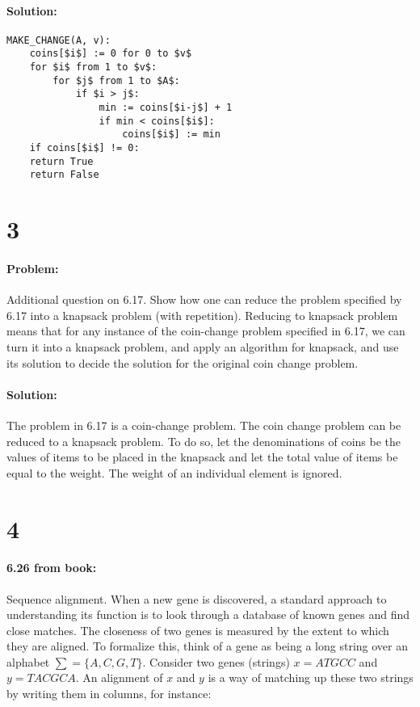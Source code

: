 \documentclass[12pt]{article}
\begin{document}
\paragraph{Solution:}
\begin{lstlisting}[mathescape]
MAKE_CHANGE(A, v):
    coins[$i$] := 0 for 0 to $v$
    for $i$ from 1 to $v$:
        for $j$ from 1 to $A$:
            if $i > j$:
                min := coins[$i-j$] + 1
                if min < coins[$i$]:
                    coins[$i$] := min
    if coins[$i$] != 0:
	return True
    return False
\end{lstlisting}

\section*{3}
\paragraph{Problem:}
Additional question on 6.17. Show how one can reduce the problem specified by
6.17 into a knapsack problem (with repetition). Reducing to knapsack problem
means that for any instance of the coin-change problem specified in 6.17, we
can turn it into a knapsack problem, and apply an algorithm for knapsack, and
use its solution to decide the solution for the original coin change problem.
\paragraph{Solution:}

The problem in 6.17 is a coin-change problem. The coin change problem
can be reduced to a knapsack problem. To do so, let the denominations of
coins be the values of items to be placed in the knapsack and let the
total value of items be equal to the weight. The weight of an individual
element is ignored.

\section*{4}
\paragraph{6.26 from book:}
Sequence alignment. When a new gene is discovered, a standard approach to
understanding its function is to look through a database of known genes and
find close matches. The closeness of two genes is measured by the extent to 
which they are aligned. To formalize this, think of a gene as being a long
string over an alphabet $\sum = \{A, C, G, T\}$. Consider two genes (strings)
$x = AT GCC$ and $y = T ACGCA$. An alignment of $x$ and $y$ is a way of matching up
these two strings by writing them in columns, for instance:
\end{document}
